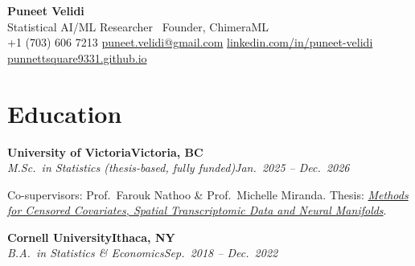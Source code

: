 \documentclass[9pt]{extarticle}
\newcommand{\heading}[4]{%
  \textbf{#1}\hfill\textbf{#2}\\[0.5pt]
  \null\textit{#3}\hfill\textit{#4}\par\vspace{0.5pt}}
\begin{document}
\begin{center}
  {\LARGE\bfseries\color{accent} Puneet Velidi}\\[2pt]
  {\small Statistical AI/ML Researcher \textperiodcentered\ Founder, ChimeraML}\\[2pt]
  {\small
  +1 (703) 606 7213 \quad\textperiodcentered\quad
  \href{mailto:puneet.velidi@gmail.com}{puneet.velidi@gmail.com} \quad\textperiodcentered\quad
  \href{https://linkedin.com/in/puneet-velidi}{linkedin.com/in/puneet-velidi} \quad\textperiodcentered\quad
  \href{https://punnettsquare9331.github.io}{punnettsquare9331.github.io}}
\end{center}
\vspace{1pt}

\section{Education}
\heading{University of Victoria}{Victoria, BC}
  {M.Sc.\ in Statistics (thesis-based, fully funded)}{Jan.\ 2025 -- Dec.\ 2026}
{\small Co-supervisors: Prof.\ Farouk Nathoo \& Prof.\ Michelle Miranda. Thesis: \href{https://dspace.library.uvic.ca/items/512a9f35-5f31-42f1-9f30-50feaaaf1158}{\textit{Methods for Censored Covariates, Spatial Transcriptomic Data and Neural Manifolds}}.}\par
\vspace{1.5pt}
\heading{Cornell University}{Ithaca, NY}
  {B.A.\ in Statistics \& Economics}{Sep.\ 2018 -- Dec.\ 2022}

\end{document}
